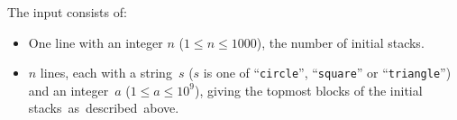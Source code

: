 
  The input consists of:
  \begin{itemize}
    \item One line with an integer $n$ ($1 \le n \le 1000$), the number of initial stacks.
    \item $n$ lines, each with a string~$s$ ($s$ is one of ``\texttt{circle}'', ``\texttt{square}'' or ``\texttt{triangle}'') and an integer~$a$ ($1 \le a \le 10^9$), giving the topmost blocks of the initial stacks~as~described~above.
  \end{itemize}


\vspace{-3mm}
